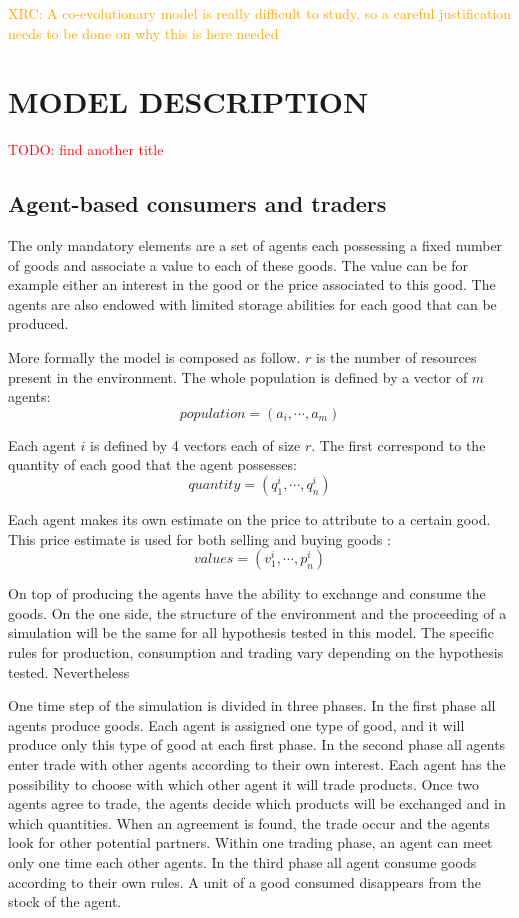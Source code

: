 \documentclass{wscpaperproc}
\newcommand{\memo}[2]{\textcolor{#1}{#2}}
\newcommand{\todo}[1]{\memo{red}{TODO: #1\\}}
\newcommand{\xrc}[1]{\memo{orange}{XRC: #1\\}}
\begin{document}
\xrc{A co-evolutionary model is really difficult to study, so a careful justification needs to be done on why this is here needed}

\section{MODEL DESCRIPTION}

\todo{find another title}
\subsection{Agent-based consumers and traders}

The only mandatory elements are a set of agents each possessing a fixed number of goods and associate a value to each of these goods. The value can be for example either an interest in the good or the price associated to this good. The agents are also endowed with limited storage abilities for each good that can be produced. 


More formally the model is composed as follow. $r$ is the number of resources present in the environment. The whole population is defined by a vector of $m$ agents: 
$$ population = (a_i, \cdots ,a_m) $$
		
Each agent $i$ is defined by 4 vectors each of size $r$. The first correspond to the quantity of each good that the agent possesses: $$ quantity = (q^i_1,\cdots,q^i_n) $$

Each agent makes its own estimate on the price to attribute to a certain good. This price estimate is used for both selling and buying goods :
$$ values = (v^i_1,\cdots,p^i_n) $$

On top of producing the agents have the ability to exchange and consume the goods. 
On the one side, the structure of the environment and the proceeding of a simulation will be the same for all hypothesis tested in this model. The specific rules for production, consumption and trading vary depending on the hypothesis tested. Nevertheless 

One time step of the simulation is divided in three phases. In the first phase all agents produce goods. Each agent is assigned one type of good, and it will produce only this type of good at each first phase. In the second phase all agents enter trade with other agents according to their own interest. Each agent has the possibility to choose with which other agent it will trade products. Once two agents agree to trade, the agents decide which products will be exchanged and in which quantities. When an agreement is found, the trade occur and the agents look for other potential partners. Within one trading phase, an agent can meet only one time each other agents. In the third phase all agent consume goods according to their own rules. A unit of a good consumed disappears from the stock of the agent.
\end{document}
